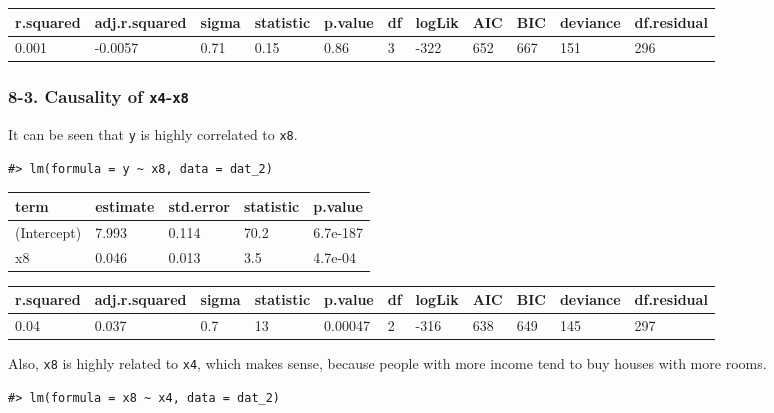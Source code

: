\documentclass[a4paper]{article}
\begin{document}
\begin{table}[H]
\centering
\begin{tabular}{lllllllllll}
\toprule
r.squared & adj.r.squared & sigma & statistic & p.value & df & logLik & AIC & BIC & deviance & df.residual\\
\midrule
0.001 & -0.0057 & 0.71 & 0.15 & 0.86 & 3 & -322 & 652 & 667 & 151 & 296\\
\bottomrule
\end{tabular}
\end{table}

\hypertarget{causality-of-x4-x8}{%
\subsubsection{\texorpdfstring{8-3. Causality of
\texttt{x4}-\texttt{x8}}{8-3. Causality of x4-x8}}\label{causality-of-x4-x8}}

It can be seen that \texttt{y} is highly correlated to \texttt{x8}.

\begin{verbatim}
#> lm(formula = y ~ x8, data = dat_2)
\end{verbatim}

\begin{table}[H]
\centering
\begin{tabular}{lllll}
\toprule
term & estimate & std.error & statistic & p.value\\
\midrule
(Intercept) & 7.993 & 0.114 & 70.2 & 6.7e-187\\
x8 & 0.046 & 0.013 & 3.5 & 4.7e-04\\
\bottomrule
\end{tabular}
\end{table}

\begin{table}[H]
\centering
\begin{tabular}{lllllllllll}
\toprule
r.squared & adj.r.squared & sigma & statistic & p.value & df & logLik & AIC & BIC & deviance & df.residual\\
\midrule
0.04 & 0.037 & 0.7 & 13 & 0.00047 & 2 & -316 & 638 & 649 & 145 & 297\\
\bottomrule
\end{tabular}
\end{table}

Also, \texttt{x8} is highly related to \texttt{x4}, which makes sense,
because people with more income tend to buy houses with more rooms.

\begin{verbatim}
#> lm(formula = x8 ~ x4, data = dat_2)
\end{verbatim}
\end{document}
